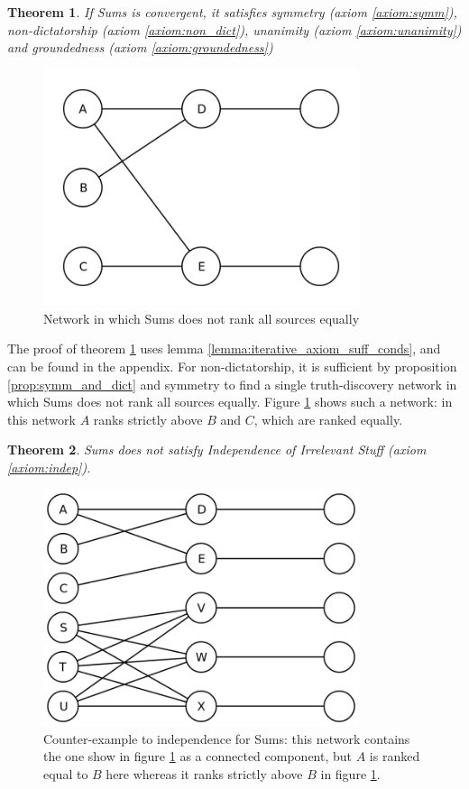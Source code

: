 \documentclass{article}
\theoremstyle{definition} \newtheorem{definition}{Definition}
\theoremstyle{definition} \newtheorem{example}{Example}
\theoremstyle{plain} \newtheorem{axiom}{Axiom}
\theoremstyle{plain} \newtheorem*{remark}{Remark}
\theoremstyle{remark} \newtheorem*{notation}{Notation}
\theoremstyle{plain} \newtheorem{lemma}{Lemma}
\theoremstyle{plain} \newtheorem{theorem}{Theorem}
\theoremstyle{plain} \newtheorem{proposition}{Proposition}
\begin{document}
\begin{theorem}
\label{theorem:sums_axioms}
If Sums is convergent, it satisfies symmetry (axiom \ref{axiom:symm}),
non-dictatorship (axiom \ref{axiom:non_dict}), unanimity (axiom
\ref{axiom:unanimity}) and groundedness (axiom \ref{axiom:groundedness})
\end{theorem}

\begin{figure}
    \centering
    \includegraphics[width=25em]{sums_not_all_equal_trust}
    \caption{Network in which Sums does not rank all sources equally}
    \label{img:sums_not_all_equal_trust}
\end{figure}

The proof of theorem \ref{theorem:sums_axioms} uses lemma
\ref{lemma:iterative_axiom_suff_conds}, and can be found in the appendix. For
non-dictatorship, it is sufficient by proposition \ref{prop:symm_and_dict} and
symmetry to find a single truth-discovery network in which Sums does not rank
all sources equally. Figure \ref{img:sums_not_all_equal_trust} shows such a
network: in this network $A$ ranks strictly above $B$ and $C$, which are ranked
equally.

\begin{theorem}
\label{theorem:sums_non_indep}
Sums does not satisfy Independence of Irrelevant Stuff (axiom
\ref{axiom:indep}).
\end{theorem}

\begin{figure}
    \centering
    \includegraphics[width=25em]{sums_non_independence}
    \caption{
        Counter-example to independence for Sums: this network contains the one
        show in figure \ref{img:sums_not_all_equal_trust} as a connected
        component, but $A$ is ranked equal to $B$ here whereas it ranks
        strictly above $B$ in figure \ref{img:sums_not_all_equal_trust}.
    }
    \label{img:sums_non_indep}
\end{figure}
\end{document}
